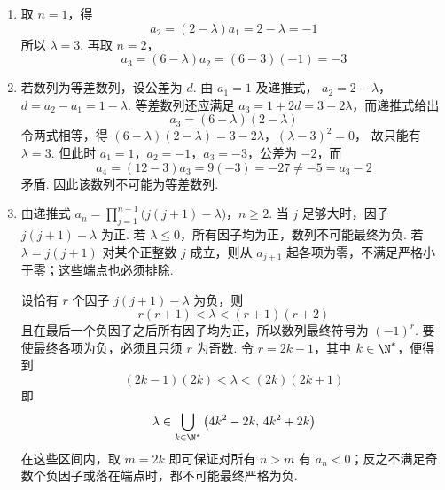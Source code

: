 \begin{solution}
\begin{enumerate}
\item 取 \(n=1\)，得
\[
a_2=(2-\lambda)a_1=2-\lambda=-1
\]
所以 \(\lambda=3\). 再取 \(n=2\)，
\[
a_3=(6-\lambda)a_2=(6-3)(-1)=-3
\]
\item 若数列为等差数列，设公差为 \(d\). 由 \(a_1=1\) 及递推式，
\(a_2=2-\lambda\)，\(d=a_2-a_1=1-\lambda\).
等差数列还应满足 \(a_3=1+2d=3-2\lambda\)，而递推式给出
\[
a_3=(6-\lambda)(2-\lambda)
\]
令两式相等，得
\((6-\lambda)(2-\lambda)=3-2\lambda\)，\((\lambda-3)^2=0\)，
故只能有 \(\lambda=3\). 但此时
\(a_1=1\)，\(a_2=-1\)，\(a_3=-3\)，公差为 \(-2\)，而
\[
a_4=(12-3)a_3=9(-3)=-27\ne-5=a_3-2
\]
矛盾. 因此该数列不可能为等差数列.
\item 由递推式
\(a_n=\prod_{j=1}^{n-1}\bigl(j(j+1)-\lambda\bigr)\)，\(n\geqslant2\).
当 \(j\) 足够大时，因子 \(j(j+1)-\lambda\) 为正. 若 \(\lambda\leqslant0\)，所有因子均为正，数列不可能最终为负. 若 \(\lambda=j(j+1)\) 对某个正整数 \(j\) 成立，则从 \(a_{j+1}\) 起各项为零，不满足严格小于零；这些端点也必须排除.

设恰有 \(r\) 个因子 \(j(j+1)-\lambda\) 为负，则
\[
r(r+1)<\lambda<(r+1)(r+2)
\]
且在最后一个负因子之后所有因子均为正，所以数列最终符号为 \((-1)^r\). 要使最终各项为负，必须且只须 \(r\) 为奇数. 令 \(r=2k-1\)，其中 \(k\in\N^*\)，便得到
\[
(2k-1)(2k)<\lambda<(2k)(2k+1)
\]
即
\[
\lambda\in\bigcup_{k\in\N^*}\left(4k^2-2k,\,4k^2+2k\right)
\]
在这些区间内，取 \(m=2k\) 即可保证对所有 \(n>m\) 有 \(a_n<0\)；反之不满足奇数个负因子或落在端点时，都不可能最终严格为负.
\end{enumerate}
\end{solution}
